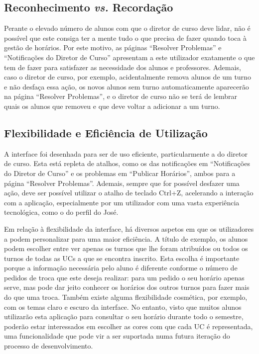 \documentclass[12pt, a4paper]{article}
\begin{document}
\subsection{Reconhecimento \emph{vs.} Recordação}

Perante o elevado número de alunos com que o diretor de curso deve lidar, não é possível que este
consiga ter a mente tudo o que precisa de fazer quando toca à gestão de horários. Por este motivo,
as páginas ``Resolver Problemas'' e ``Notificações do Diretor de Curso'' apresentam a este
utilizador exatamente o que tem de fazer para satisfazer as necessidade dos alunos e professores.
Ademais, caso o diretor de curso, por exemplo, acidentalmente remova alunos de um turno e não
desfaça essa ação, os novos alunos sem turno automaticamente aparecerão na página
``Resolver Problemas'', e o diretor de curso não se terá de lembrar quais os alunos que removeu e
que deve voltar a adicionar a um turno.

\subsection{Flexibilidade e Eficiência de Utilização}

A interface foi desenhada para ser de uso eficiente, particularmente a do diretor de curso. Esta
está repleta de atalhos, como os das notificações em ``Notificações do Diretor de Curso'' e os
problemas em ``Publicar Horários'', ambos para a página ``Resolver Problemas''. Ademais, sempre que
for possível desfazer uma ação, deve ser possível utilizar o atalho de teclado Ctrl+Z, acelerando a
interação com a aplicação, especialmente por um utilizador com uma vasta experiência tecnológica,
como o do perfil do José.

Em relação à flexibilidade da interface, há diversos aspetos em que os utilizadores a podem
personalizar para uma maior eficiência. A título de exemplo, os alunos podem escolher entre ver
apenas os turnos que lhe foram atribuídos ou todos os turnos de todas as UCs a que se encontra
inscrito. Esta escolha é importante porque a informação necessária pelo aluno é diferente
conforme o número de pedidos de troca que este deseja realizar: para um pedido o seu horário apenas
serve, mas pode dar jeito conhecer os horários dos outros turnos para fazer mais do que uma troca.
Também existe alguma flexibilidade cosmética, por exemplo, com os temas claro e escuro da interface.
No entanto, visto que muitos alunos utilizarão esta aplicação para consultar o seu horário durante
todo o semestre, poderão estar interessados em escolher as cores com que cada UC é representada, uma
funcionalidade que pode vir a ser suportada numa futura iteração do processo de desenvolvimento.
\end{document}
